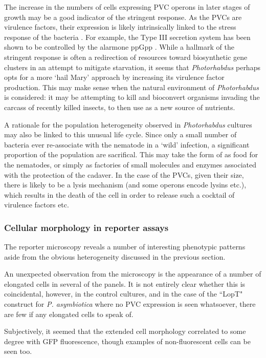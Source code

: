 The increase in the numbers of cells expressing PVC operons in later stages of growth may be a good indicator of the stringent response. As the PVCs are virulence factors, their expression is likely intrinsically linked to the stress response of the bacteria \citep{Dalebroux2010, Chatnaparat2015 }. For example, the Type III secretion system has been shown to be controlled by the alarmone ppGpp \citep{Ancona2015}. While a hallmark of the stringent response is often a redirection of resources toward biosynthetic gene clusters in an attempt to mitigate starvation, it seems that \emph{Photorhabdus} perhaps opts for a more `hail Mary' approach by increasing its virulence factor production. This may make sense when the natural environment of \emph{Photorhabdus} is considered: it may be attempting to kill and bioconvert organisms invading the carcass of recently killed insects, to then use as a new source of nutrients.

A rationale for the population heterogeneity observed in \emph{Photorhabdus} cultures may also be linked to this unusual life cycle. Since only a small number of bacteria ever re-associate with the nematode in a `wild' infection, a significant proportion of the population are sacrifical. This may take the form of as food for the nematodes, or simply as factories of small molecules and enzymes associated with the protection of the cadaver. In the case of the PVCs, given their size, there is likely to be a lysis mechanism (and some operons encode lysins etc.), which results in the death of the cell in order to release such a cocktail of virulence factors etc.

\subsubsection{Cellular morphology in reporter assays}
The reporter microscopy reveals a number of interesting phenotypic patterns aside from the obvious heterogeneity discussed in the previous section.

An unexpected observation from the microscopy is the appearance of a number of elongated cells in several of the panels. It is not entirely clear whether this is coincidental, however, in the control cultures, and in the case of the ``LopT" construct for \emph{P. asymbiotica} where no PVC expression is seen whatsoever, there are few if any elongated cells to speak of.

Subjectively, it seemed that the extended cell morphology correlated to some degree with GFP fluorescence, though examples of non-fluorescent cells can be seen too.

